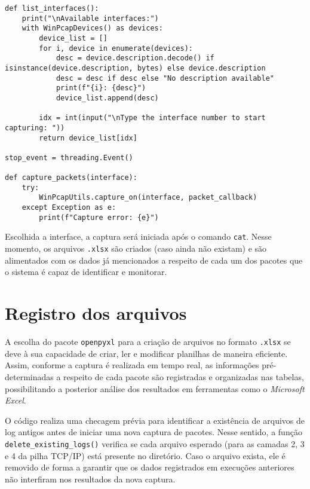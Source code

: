 \documentclass[12pt]{article}
\begin{document}
\begin{lstlisting}[style=vscode]
def list_interfaces():
    print("\nAvailable interfaces:")
    with WinPcapDevices() as devices:
        device_list = []
        for i, device in enumerate(devices):
            desc = device.description.decode() if isinstance(device.description, bytes) else device.description
            desc = desc if desc else "No description available"
            print(f"{i}: {desc}")
            device_list.append(desc)

        idx = int(input("\nType the interface number to start capturing: "))
        return device_list[idx]

stop_event = threading.Event()

def capture_packets(interface):
    try:
        WinPcapUtils.capture_on(interface, packet_callback)
    except Exception as e:
        print(f"Capture error: {e}")
\end{lstlisting}

\quad Escolhida a interface, a captura será iniciada após o comando \texttt{cat}. Nesse momento, os arquivos \texttt{.xlsx} são criados (caso ainda não existam) e são alimentados com os dados já mencionados a respeito de cada um dos pacotes que o sistema é capaz de identificar e monitorar.

\section{Registro dos arquivos}
A escolha do pacote \texttt{openpyxl} para a criação de arquivos no formato \texttt{.xlsx} se deve à sua capacidade de criar, ler e modificar planilhas de maneira eficiente. Assim, conforme a captura é realizada em tempo real, as informações pré-determinadas a respeito de cada pacote são registradas e organizadas nas tabelas, possibilitando a posterior análise dos resultados em ferramentas como o \emph{Microsoft Excel}.

\quad O código realiza uma checagem prévia para identificar a existência de arquivos de log antigos antes de iniciar uma nova captura de pacotes. Nesse sentido, a função \texttt{delete\_existing\_logs()} verifica se cada arquivo esperado (para as camadas 2, 3 e 4 da pilha TCP/IP) está presente no diretório. Caso o arquivo exista, ele é removido de forma a garantir que os dados registrados em execuções anteriores não interfiram nos resultados da nova captura.
\end{document}
